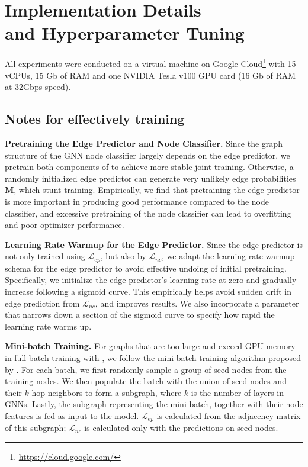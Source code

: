 \documentclass[letterpaper]{article} \usepackage{aaai21}  \usepackage{times}  \usepackage{helvet} \usepackage{courier}  \usepackage[hyphens]{url}  \usepackage{graphicx} \urlstyle{rm} \def\UrlFont{\rm}  \usepackage{natbib}  \usepackage{caption} \frenchspacing  \setlength{\pdfpagewidth}{8.5in}  \setlength{\pdfpageheight}{11in}
\begin{document}
\section{Implementation Details \\ and Hyperparameter Tuning}
All experiments were conducted on a virtual machine on Google Cloud\footnote{\url{https://cloud.google.com/}} with 15 vCPUs, 15 Gb of RAM and one NVIDIA Tesla v100 GPU card (16 Gb of RAM at 32Gbps speed).

\subsection{Notes for effectively training \method}
\label{appn:implementation_gaug}

\noindent \textbf{Pretraining the Edge Predictor and Node Classifier.} Since the graph structure of the GNN node classifier largely depends on the edge predictor, we pretrain both components of \method to achieve more stable joint training. Otherwise, a randomly initialized edge predictor can generate very unlikely edge probabilities $\mathbf{M}$, which stunt training.  Empirically, we find that pretraining the edge predictor is more important in producing good performance compared to the node classifier, and excessive pretraining of the node classifier can lead to overfitting and poor optimizer performance.

\noindent \textbf{Learning Rate Warmup for the Edge Predictor.} 
Since the edge predictor is not only trained using $\mathcal{L}_{ep}$, but also by $\mathcal{L}_{nc}$, we adapt the learning rate warmup schema \cite{goyal2017accurate} for the edge predictor to avoid effective undoing of initial pretraining. Specifically, we initialize the edge predictor's learning rate at zero and gradually increase following a sigmoid curve. This empirically helps avoid sudden drift in edge prediction from $\mathcal{L}_{nc}$, and improves results. 
We also incorporate a parameter that narrows down a section of the sigmoid curve to specify how rapid the learning rate warms up.

\noindent \textbf{Mini-batch Training.}
For graphs that are too large and exceed GPU memory in full-batch training with \method, we follow the mini-batch training algorithm proposed by \citet{hamilton2017inductive}. For each batch, we first randomly sample a group of seed nodes from the training nodes. We then populate the batch with the union of seed nodes and their $k$-hop neighbors to form a subgraph, where $k$ is the number of layers in GNNs. Lastly, the subgraph representing the mini-batch, together with their node features is fed as input to the model. $\mathcal{L}_{ep}$ is calculated from the adjacency matrix of this subgraph; $\mathcal{L}_{nc}$ is calculated only with the predictions on seed nodes. 
\end{document}
